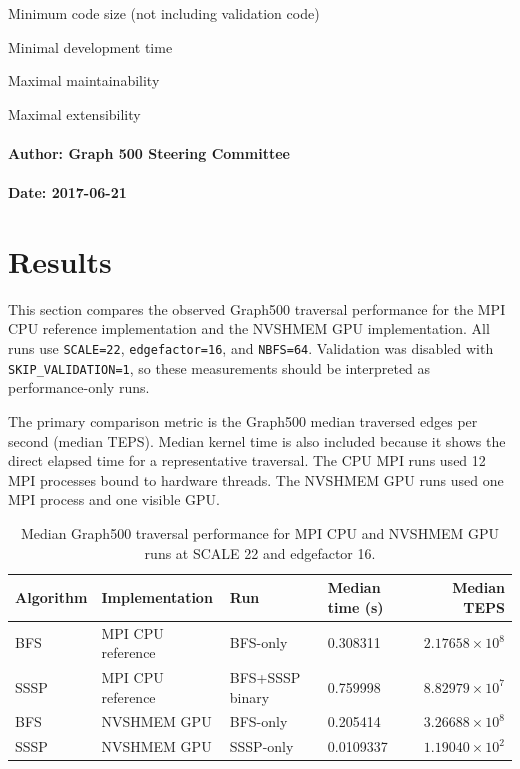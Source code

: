 \documentclass{article}
\begin{document}
Minimum code size (not including validation code)

Minimal development time

Maximal maintainability

Maximal extensibility

\paragraph*{Author: Graph 500 Steering Committee}

\paragraph*{Date: 2017-06-21}

\section{Results}

This section compares the observed Graph500 traversal performance for the MPI CPU reference implementation and the NVSHMEM GPU implementation. All runs use \texttt{SCALE=22}, \texttt{edgefactor=16}, and \texttt{NBFS=64}. Validation was disabled with \texttt{SKIP\_VALIDATION=1}, so these measurements should be interpreted as performance-only runs.

The primary comparison metric is the Graph500 median traversed edges per second (median TEPS). Median kernel time is also included because it shows the direct elapsed time for a representative traversal. The CPU MPI runs used 12 MPI processes bound to hardware threads. The NVSHMEM GPU runs used one MPI process and one visible GPU.

\begin{table}[h]
\centering
\begin{tabular}{llllr}
\hline
Algorithm & Implementation & Run & Median time (s) & Median TEPS \\
\hline
BFS & MPI CPU reference & BFS-only & 0.308311 & $2.17658 \times 10^{8}$ \\
SSSP & MPI CPU reference & BFS+SSSP binary & 0.759998 & $8.82979 \times 10^{7}$ \\
BFS & NVSHMEM GPU & BFS-only & 0.205414 & $3.26688 \times 10^{8}$ \\
SSSP & NVSHMEM GPU & SSSP-only & 0.0109337 & $1.19040 \times 10^{2}$ \\
\hline
\end{tabular}
\caption{Median Graph500 traversal performance for MPI CPU and NVSHMEM GPU runs at SCALE 22 and edgefactor 16.}
\end{table}
\end{document}
